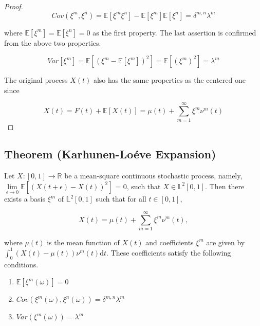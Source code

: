\documentclass[11pt,twoside,a4paper]{article}
\begin{document}
\begin{proof}
		\begin{equation}
			Cov\left(\xi^m, \xi^n\right) = \mathbb{E}[\xi^m \xi^n] - \mathbb{E}[\xi^m]\mathbb{E}[\xi^n] = \delta^{m,n}\lambda^{m}
		\end{equation}
	
		where $\mathbb{E}[\xi^m] = \mathbb{E}[\xi^n] = 0$ as the first property.
		The last assertion is confirmed from the above two properties.
		
		\begin{equation}\label{Lemma3}
			Var[\xi^m] = \mathbb{E}\left[(\xi^m - \mathbb{E}[\xi^m])^{2}\right] = \mathbb{E}[(\xi^m)^{2}] =\lambda^m
		\end{equation}
	
		The original process $X(t)$ also has the same properties as the centered one since
		
		\begin{equation}
			X(t) = F(t) + \mathbb{E}[X(t)] = \mu(t) + \sum_{m=1}^{\infty}\xi^m\nu^m(t)
		\end{equation}
	
	\end{proof}
	
	
	\subsection{Theorem (Karhunen-Lo\'{e}ve Expansion)} \label{Proof2}
	
	Let $X : [0,1]  \rightarrow \mathbb{R}$ be a mean-square continuous stochastic process, namely, $\lim\limits_{\epsilon \rightarrow 0} \mathbb{E}[(X(t+\epsilon) - X(t))^2]$ = 0, such that $X \in \mathbb{L}^{2}[0,1]$. Then there exists a basis ${\xi^m}$ of $\mathbb{L}^2[0,1]$ such that for all $t \in [0,1]$,
	
	\begin{equation}
		X(t) = \mu(t) + \sum_{m=1}^{\infty} \xi^m \nu^m(t),
	\end{equation}

	where $\mu(t)$ is the mean function of $X(t)$ and coefficients $\xi^m$ are given by $\int_{0}^{1} (X(t) - \mu(t)) \nu^m(t)\mathrm{d}t$. These coefficients satisfy the following conditions.
	
	\begin{multicols}{2}
		\begin{enumerate}
			\item $\mathbb{E}\left[\xi^m(\omega)\right] = 0$
			\item $Cov\left(\xi^m(\omega), \xi^n(\omega)\right) = \delta^{m,n}\lambda^m$ %
			\item $Var\left(\xi^m(\omega)\right) = \lambda^m$
		\end{enumerate}
	\end{multicols}
\end{document}
